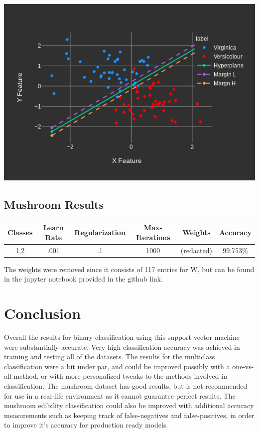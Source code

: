 \documentclass[12pt]{article}%
\begin{document}
	\includegraphics[scale=.3]{./iris3.png}
	
	\subsection{Mushroom Results}
		\begin{center}
		\begin{tabular}{||c c c c c c||} 
			\hline
			Classes & Learn Rate & Regularization & Max-Iterations & Weights & Accuracy\\ [0.5ex] 
			\hline\hline
			1,2 & .001 & .1 & 1000 & (redacted) & 99.753\% \\ [1ex] 
			\hline
		\end{tabular}
	\end{center}
	The weights were removed since it consists of 117 entries for W, but can be found in the jupyter notebook provided in the github link.
	\section{Conclusion}
	Overall the results for binary classification using this support vector machine were substantially accurate.  Very high classification accuracy was achieved in training and testing all of the datasets.  The results for the multiclass classification were a bit under par, and could be improved possibly with a one-vs-all method, or with more personalized tweaks to the methods involved in classification.  The mushroom dataset has good results, but is not recommended for use in a real-life environment as it cannot guarantee perfect results.  The mushroom edibility classification could also be improved with additional accuracy measurements such as keeping track of false-negatives and false-positives, in order to improve it's accuracy for production ready models.
	
\end{document}
